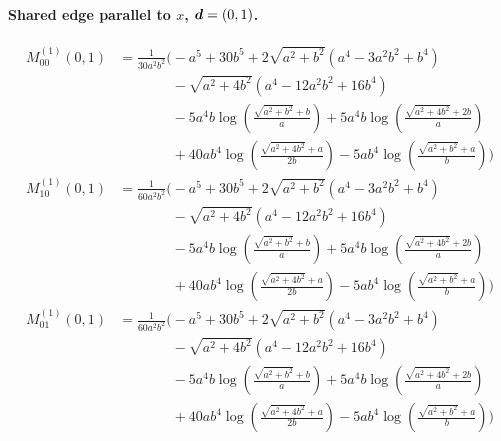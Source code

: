 \paragraph{Shared edge parallel to $x$, $\vb*{d}=(0,1)$.}
\begin{align*}
M^{(1)}_{00}(0,1) &= \frac{1}{30 a^{2} b^{2}}\Bigg(- a^{5} + 30 b^{5} + 2 \sqrt{a^{2} + b^{2}}\left(a^{4} - 3 a^{2} b^{2} + b^{4}\right)\\
&\phantom{{}=\frac{1}{30 a^{2} b^{2}}\Bigg(}- \sqrt{a^{2} + 4 b^{2}}\left(a^{4} - 12 a^{2} b^{2} + 16 b^{4}\right)\\
&\phantom{{}=\frac{1}{30 a^{2} b^{2}}\Bigg(}- 5 a^{4} b \log\left(\frac{\sqrt{a^{2} + b^{2}} + b}{a}\right) + 5 a^{4} b \log\left(\frac{\sqrt{a^{2} + 4 b^{2}} + 2 b}{a}\right)\\
&\phantom{{}=\frac{1}{30 a^{2} b^{2}}\Bigg(}+ 40 a b^{4} \log\left(\frac{\sqrt{a^{2} + 4 b^{2}} + a}{2 b}\right) - 5 a b^{4} \log\left(\frac{\sqrt{a^{2} + b^{2}} + a}{b}\right)\Bigg)\\[1.2ex]
M^{(1)}_{10}(0,1) &= \frac{1}{60 a^{2} b^{2}}\Bigg(- a^{5} + 30 b^{5} + 2 \sqrt{a^{2} + b^{2}}\left(a^{4} - 3 a^{2} b^{2} + b^{4}\right)\\
&\phantom{{}=\frac{1}{60 a^{2} b^{2}}\Bigg(}- \sqrt{a^{2} + 4 b^{2}}\left(a^{4} - 12 a^{2} b^{2} + 16 b^{4}\right)\\
&\phantom{{}=\frac{1}{60 a^{2} b^{2}}\Bigg(}- 5 a^{4} b \log\left(\frac{\sqrt{a^{2} + b^{2}} + b}{a}\right) + 5 a^{4} b \log\left(\frac{\sqrt{a^{2} + 4 b^{2}} + 2 b}{a}\right)\\
&\phantom{{}=\frac{1}{60 a^{2} b^{2}}\Bigg(}+ 40 a b^{4} \log\left(\frac{\sqrt{a^{2} + 4 b^{2}} + a}{2 b}\right) - 5 a b^{4} \log\left(\frac{\sqrt{a^{2} + b^{2}} + a}{b}\right)\Bigg)\\[1.2ex]
M^{(1)}_{01}(0,1) &= \frac{1}{60 a^{2} b^{2}}\Bigg(- a^{5} + 30 b^{5} + 2 \sqrt{a^{2} + b^{2}}\left(a^{4} - 3 a^{2} b^{2} + b^{4}\right)\\
&\phantom{{}=\frac{1}{60 a^{2} b^{2}}\Bigg(}- \sqrt{a^{2} + 4 b^{2}}\left(a^{4} - 12 a^{2} b^{2} + 16 b^{4}\right)\\
&\phantom{{}=\frac{1}{60 a^{2} b^{2}}\Bigg(}- 5 a^{4} b \log\left(\frac{\sqrt{a^{2} + b^{2}} + b}{a}\right) + 5 a^{4} b \log\left(\frac{\sqrt{a^{2} + 4 b^{2}} + 2 b}{a}\right)\\
&\phantom{{}=\frac{1}{60 a^{2} b^{2}}\Bigg(}+ 40 a b^{4} \log\left(\frac{\sqrt{a^{2} + 4 b^{2}} + a}{2 b}\right) - 5 a b^{4} \log\left(\frac{\sqrt{a^{2} + b^{2}} + a}{b}\right)\Bigg)\\[1.2ex]

\end{align*}
